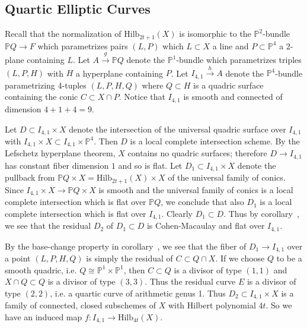 \documentclass[amssymb,twoside,12 pt,amscd,reqno]{amsart}
\theoremstyle{plain}
\theoremstyle{definition}
\newcommand{\PP}{\mathbb{P}}
\newcommand{\HI}[2]{\text{Hilb}_{#1}(#2)}
\def\ps{\vspace{4pt}}
\begin{document}
\subsection{Quartic Elliptic Curves}

Recall that the normalization of $\HI{2t+1}{X}$ is isomorphic to the
$\PP^2$-bundle $\PP 
Q\rightarrow F$ which parametrizes pairs $(L,P)$ which $L\subset X$
a line and $P\subset\PP^4$ a $2$-plane containing $L$.    
Let $A\xrightarrow{g} \PP Q$ denote the $\PP^1$-bundle
which parametrizes triples $(L,P,H)$ with $H$ a hyperplane containing
$P$.  Let $I_{4,1}\xrightarrow{h} A$ denote the $\PP^4$-bundle parametrizing
4-tuples $(L,P,H,Q)$ where $Q\subset H$ is a quadric surface
containing the conic $C\subset X\cap P$. 
Notice that $I_{4,1}$ is smooth
and connected of dimension $4+1+4=9$.

\ps

Let $D\subset I_{4,1}\times X$
denote the intersection of the universal quadric surface over $I_{4,1}$ with 
$I_{4,1}\times X\subset I_{4,1}\times \PP^4$.  Then $D$ is a local complete
intersection scheme.  By the Lefschetz hyperplane theorem, $X$
contains no quadric surfaces; therefore $D\rightarrow I_{4,1}$ has constant
fiber dimension $1$ and so is flat.  Let $D_1\subset I_{4,1}\times X$ denote
the pullback from $\PP Q\times X =\HI{2t+1}{X}\times X$ of the
universal family of conics.  Since $I_{4,1}\times X\rightarrow \PP Q\times
X$ is smooth and the universal family of conics is a local complete
intersection which is flat over $\PP Q$, we conclude that also $D_1$ is a
local complete intersection which is flat over $I_{4,1}$.  Clearly
$D_1\subset D$.  Thus by corollary~\cite[corollary 2.7]{HRS1}, we see that the
residual $D_2$ of $D_1\subset D$ is Cohen-Macaulay and flat over $I_{4,1}$.

\ps

By the base-change property in corollary~\cite[corollary 2.7]{HRS1},
we see that 
the fiber of $D_1\rightarrow I_{4,1}$ over a point $(L,P,H,Q)$ is simply the
residual of $C\subset Q\cap X$.  If we choose $Q$ to be a smooth
quadric, i.e. $Q\cong \PP^1\times \PP^1$, then $C\subset Q$ is a
divisor of type $(1,1)$ and $X\cap Q\subset Q$ is a divisor of type
$(3,3)$.  Thus the residual curve $E$ is a divisor of type $(2,2)$,
i.e. a quartic curve of arithmetic genus 1.  Thus $D_2\subset I_{4,1}\times
X$ is a family of connected, closed subschemes of $X$ with Hilbert
polynomial $4t$.  So we have an induced map $f:I_{4,1}\rightarrow
\HI{4t}{X}$.  

\ps
\end{document}
